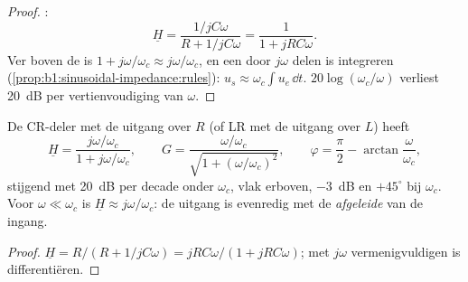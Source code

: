 \begin{proof}
:
\[
\underline H = \frac{1/jC\omega}{R + 1/jC\omega} = \frac{1}{1 + jRC\omega} .
\]
Ver boven de  is $1 + j\omega/\omega_c \approx j\omega/\omega_c$, en
een  door $j\omega$ delen is integreren
(\cref{prop:b1:sinusoidal-impedance:rules}): $u_s \approx \omega_c\int u_e\,\dd t$.
$20\log(\omega_c/\omega)$ verliest \qty{20}{dB} per vertienvoudiging van $\omega$.
\end{proof}

\begin{proposition}\label{prop:b1:filters-transfer-functions:highpass1}
De CR-deler met de uitgang over $R$ (of LR met de uitgang over $L$)
heeft
\[
\underline H = \frac{j\omega/\omega_c}{1 + j\omega/\omega_c},
\qquad G = \frac{\omega/\omega_c}{\sqrt{1 + (\omega/\omega_c)^2}},
\qquad \varphi = \frac{\pi}{2} - \arctan\frac{\omega}{\omega_c},
\]
stijgend met \qty{20}{dB} per decade onder $\omega_c$, vlak erboven, \qty{-3}{dB}
en $+45^\circ$ bij $\omega_c$. Voor $\omega \ll \omega_c$ is $\underline H
\approx j\omega/\omega_c$: de uitgang is evenredig met de
\emph{afgeleide} van de ingang.
\end{proposition}

\begin{proof}
$\underline H = R/(R + 1/jC\omega) = jRC\omega/(1 + jRC\omega)$;
met $j\omega$ vermenigvuldigen is differentiëren.
\end{proof}

